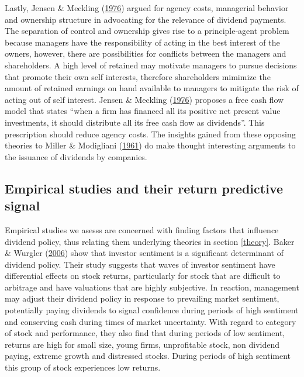 \documentclass[11pt,preprint, authoryear]{elsarticle}
\numberwithin{equation}{section}
\numberwithin{figure}{section}
\numberwithin{table}{section}
\begin{document}
Lastly, Jensen \& Meckling
(\protect\hyperlink{ref-jensen1976theory}{1976}) argued for agency
costs, managerial behavior and ownership structure in advocating for the
relevance of dividend payments. The separation of control and ownership
gives rise to a principle-agent problem because managers have the
responsibility of acting in the best interest of the owners, however,
there are possibilities for conflicts between the managers and
shareholders. A high level of retained may motivate managers to pursue
decisions that promote their own self interests, therefore shareholders
mimimize the amount of retained earnings on hand available to managers
to mitigate the risk of acting out of self interest. Jensen \& Meckling
(\protect\hyperlink{ref-jensen1976theory}{1976}) proposes a free cash
flow model that states ``when a firm has financed all its positive net
present value investments, it should distribute all its free cash flow
as dividends''. This prescription should reduce agency costs. The
insights gained from these opposing theories to Miller \& Modigliani
(\protect\hyperlink{ref-miller}{1961}) do make thought interesting
arguments to the issuance of dividends by companies.

\hypertarget{empirical-studies-and-their-return-predictive-signal}{%
\subsection{Empirical studies and their return predictive
signal}\label{empirical-studies-and-their-return-predictive-signal}}

Empirical studies we asesss are concerned with finding factors that
influence dividend policy, thus relating them underlying theories in
section \ref{theory}. Baker \& Wurgler
(\protect\hyperlink{ref-baker2006investor}{2006}) show that investor
sentiment is a significant determinant of dividend policy. Their study
suggests that waves of investor sentiment have differential effects on
stock returns, particularly for stock that are difficult to arbitrage
and have valuations that are highly subjective. In reaction, management
may adjust their dividend policy in response to prevailing market
sentiment, potentially paying dividends to signal confidence during
periods of high sentiment and conserving cash during times of market
uncertainty. With regard to category of stock and performance, they also
find that during periods of low sentiment, returns are high for small
size, young firms, unprofitable stock, non dividend paying, extreme
growth and distressed stocks. During periods of high sentiment this
group of stock experiences low returns.
\end{document}

